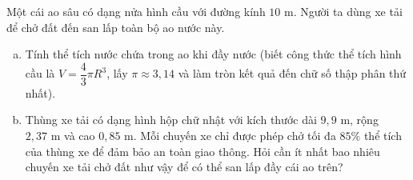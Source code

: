 \begin{bt}%
Một cái ao sâu có dạng nửa hình cầu với đường kính $10\text{ m}$. Người ta dùng xe tải để chở đất đến san lấp toàn bộ ao nước này.
\begin{enumerate}[a)]
	\item Tính thể tích nước chứa trong ao khi đầy nước (biết công thức thể tích hình cầu là $V = \dfrac{4}{3}\pi R^3$, lấy $\pi \approx 3{,}14$ và làm tròn kết quả đến chữ số thập phân thứ nhất).
	\item Thùng xe tải có dạng hình hộp chữ nhật với kích thước dài $9{,}9\text{ m}$, rộng $2{,}37\text{ m}$ và cao $0{,}85\text{ m}$. Mỗi chuyến xe chỉ được phép chở tối đa $85\%$ thể tích của thùng xe để đảm bảo an toàn giao thông. Hỏi cần ít nhất bao nhiêu chuyến xe tải chở đất như vậy để có thể san lấp đầy cái ao trên?
\end{enumerate}
\end{bt}


